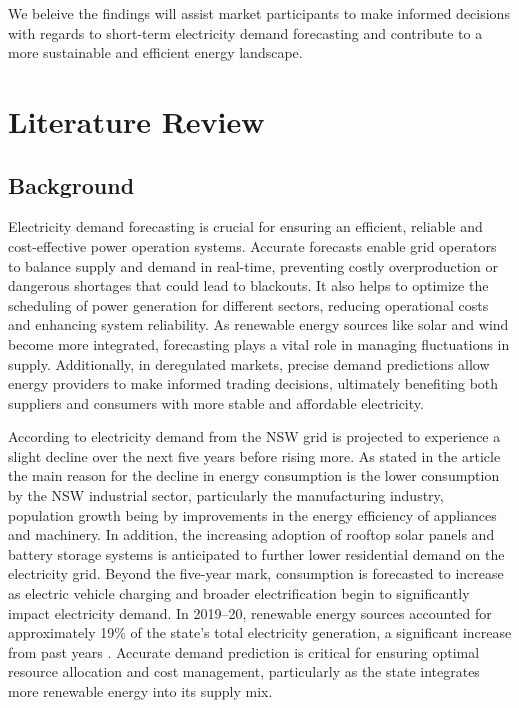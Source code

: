 \documentclass[mstat,12pt]{unswthesis}
\begin{document}
We beleive the findings will assist market participants to make informed
decisions with regards to short-term electricity demand forecasting and
contribute to a more sustainable and efficient energy landscape.

\bigskip

\chapter{Literature Review}\label{literature-review}

\section{Background}\label{background}

Electricity demand forecasting is crucial for ensuring an efficient,
reliable and cost-effective power operation systems. Accurate forecasts
enable grid operators to balance supply and demand in real-time,
preventing costly overproduction or dangerous shortages that could lead
to blackouts. It also helps to optimize the scheduling of power
generation for different sectors, reducing operational costs and
enhancing system reliability. As renewable energy sources like solar and
wind become more integrated, forecasting plays a vital role in managing
fluctuations in supply. Additionally, in deregulated markets, precise
demand predictions allow energy providers to make informed trading
decisions, ultimately benefiting both suppliers and consumers with more
stable and affordable electricity.

According to \cite{nsw_epa_2021_energy_consumption} electricity demand
from the NSW grid is projected to experience a slight decline over the
next five years before rising more. As stated in the article the main
reason for the decline in energy consumption is the lower consumption by
the NSW industrial sector, particularly the manufacturing industry,
population growth being by improvements in the energy efficiency of
appliances and machinery. In addition, the increasing adoption of
rooftop solar panels and battery storage systems is anticipated to
further lower residential demand on the electricity grid. Beyond the
five-year mark, consumption is forecasted to increase as electric
vehicle charging and broader electrification begin to significantly
impact electricity demand. In 2019--20, renewable energy sources
accounted for approximately 19\% of the state's total electricity
generation, a significant increase from past years
\cite{nsw_epa_2021_energy_consumption}. Accurate demand prediction is
critical for ensuring optimal resource allocation and cost management,
particularly as the state integrates more renewable energy into its
supply mix.
\end{document}
